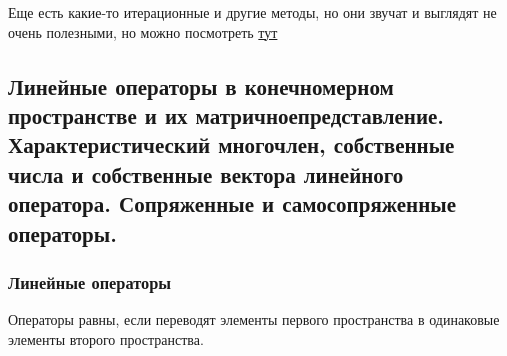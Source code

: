 \documentclass{article}
\begin{document}
	Еще есть какие-то итерационные и другие методы, но они звучат и выглядят не очень полезными, но можно посмотреть \href{https://ru.wikipedia.org/wiki/%D0%A1%D0%B8%D1%81%D1%82%D0%B5%D0%BC%D0%B0_%D0%BB%D0%B8%D0%BD%D0%B5%D0%B9%D0%BD%D1%8B%D1%85_%D0%B0%D0%BB%D0%B3%D0%B5%D0%B1%D1%80%D0%B0%D0%B8%D1%87%D0%B5%D1%81%D0%BA%D0%B8%D1%85_%D1%83%D1%80%D0%B0%D0%B2%D0%BD%D0%B5%D0%BD%D0%B8%D0%B9#:~:text=%D0%A1%D0%B8%D1%81%D1%82%D0%B5%D0%BC%D0%B0%20%D0%BB%D0%B8%D0%BD%D0%B5%D0%B9%D0%BD%D1%8B%D1%85%20%D0%B0%D0%BB%D0%B3%D0%B5%D0%B1%D1%80%D0%B0%D0%B8%D1%87%D0%B5%D1%81%D0%BA%D0%B8%D1%85%20%D1%83%D1%80%D0%B0%D0%B2%D0%BD%D0%B5%D0%BD%D0%B8%D0%B9%20(%D0%BB%D0%B8%D0%BD%D0%B5%D0%B9%D0%BD%D0%B0%D1%8F,%D0%BB%D0%B8%D0%BD%D0%B5%D0%B9%D0%BD%D1%8B%D0%BC%20%E2%80%94%20%D0%B0%D0%BB%D0%B3%D0%B5%D0%B1%D1%80%D0%B0%D0%B8%D1%87%D0%B5%D1%81%D0%BA%D0%B8%D0%BC%20%D1%83%D1%80%D0%B0%D0%B2%D0%BD%D0%B5%D0%BD%D0%B8%D0%B5%D0%BC%20%D0%BF%D0%B5%D1%80%D0%B2%D0%BE%D0%B9%20%D1%81%D1%82%D0%B5%D0%BF%D0%B5%D0%BD%D0%B8}{тут}
	
	\subsection{Линейные операторы в конечномерном пространстве и их матричноепредставление. Характеристический многочлен, собственные числа и собственные вектора линейного оператора. Сопряженные и самосопряженные операторы.}
	
	\subsubsection{ Линейные операторы}
	
	
	Операторы равны, если переводят элементы первого пространства в одинаковые элементы второго пространства.
	
\end{document}
